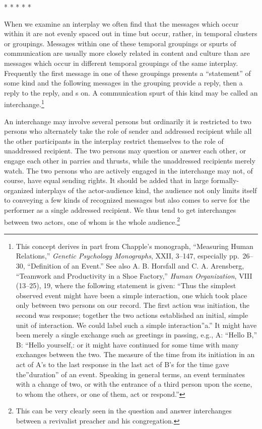 \documentclass[openany,nobib]{tufte-book}
\begin{document}
\vspace{.2in}
\begin{centering}

\Large{* * * * *}

\end{centering}
\vspace{.17in}

\noindent When we examine an interplay we often find that the messages which occur
within it are not evenly spaced out in time but occur, rather, in
temporal clusters or groupings. Messages within one of these temporal
groupings or spurts of communication are usually more closely related in
content and culture than are messages which occur in different temporal
groupings of the same interplay. Frequently the first message in one of
these groupings presents a ``statement'' of some kind and the following
messages in the grouping provide a reply, then a reply to the reply, and
s on. A communication spurt of this kind may be called an
interchange.\footnote{This concept derives in part from Chapple's
  monograph, ``Measuring Human Relations,'' \emph{Genetic Psychology
  Monographs}, XXII, 3--147, especially pp.~26--30, ``Definition of an
  Event.'' See also A. B. Horsfall and C. A. Arensberg, ``Teamwork and
  Productivity in a Shoe Factory,'' \emph{Human Organization}, VIII
  (13--25), 19, where the following statement is given: ``Thus the
  simplest observed event might have been a simple interaction, one
  which took place only between two persons on our record. The first
  action was initiation, the second was response; together the two
  actions established an initial, simple unit of interaction. We could
  label such a simple interaction''a.'' It might have been merely a
  single exchange such as greetings in passing, e.g., A: ``Hello B,'' B:
  ``Hello yourself,: or it might have continued for some time with many
  exchanges between the two. The measure of the time from its initiation
  in an act of A's to the last response in the last act of B's for the
  time gave the''duration'' of an event. Speaking in general terms, an
  event terminates with a change of two, or with the entrance of a third
  person upon the scene, to whom the others, or one of them, act or
  respond.''}

An interchange may involve several persons but ordinarily it is
restricted to two persons who alternately take the role of sender and
addressed recipient while all the other participants in the interplay
restrict themselves to the role of unaddressed recipient. The two
persons may question or answer each other, or engage each other in
parries and thrusts, while the unaddressed recipients merely watch. The
two persons who are actively engaged in the interchange may not, of
course, have equal sending rights. It should be added that in large
formally-organized interplays of the actor-audience kind, the audience
not only limits itself to conveying a few kinds of recognized messages
but also comes to serve for the performer as a single addressed
recipient. We thus tend to get interchanges between two actors, one of
whom is the whole audience.\footnote{This can be very clearly seen in
  the question and answer interchanges between a revivalist preacher and
  his congregation.}
\end{document}
